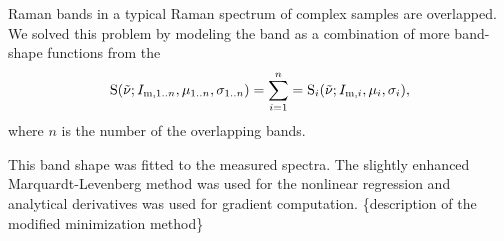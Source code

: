 Raman bands in a typical Raman spectrum of complex samples are overlapped. We
solved this problem by modeling the band as a combination of more band-shape
functions from the
\begin{equation}
	\func{S}(\wn; I_{\text{m},1..n}, \mu_{1..n}, \sigma_{1..n}) =
		\sum_{i = 1}^n = 	\func{S}_i(\wn; I_{\text{m},i}, \mu_i, \sigma_i),
	\label{\eqnlabel{band_intensities:shape}}
\end{equation}
where $n$ is the number of the overlapping bands.

This band shape was fitted to the measured spectra. The slightly enhanced
Marquardt-Levenberg method was used for the nonlinear regression and
analytical derivatives was used for gradient computation.
\MISSING\{description of the modified minimization method\}
